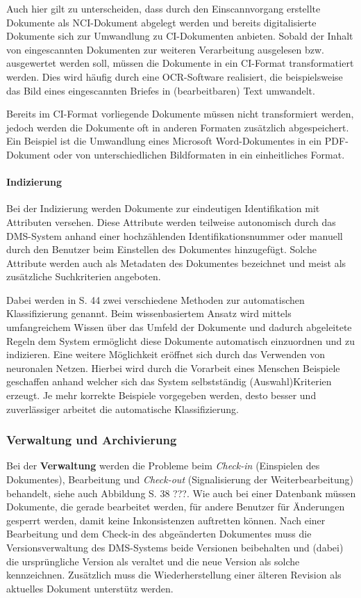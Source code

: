 Auch hier gilt zu unterscheiden, dass durch den Einscannvorgang erstellte Dokumente als \gls{NCI}-Dokument abgelegt werden und bereits digitalisierte Dokumente sich zur Umwandlung zu \gls{CI}-Dokumenten anbieten.
Sobald der Inhalt von eingescannten Dokumenten zur weiteren Verarbeitung ausgelesen bzw. ausgewertet werden soll, müssen die Dokumente in ein \gls{CI}-Format transformatiert werden.
Dies wird häufig durch eine \gls{OCR}-Software realisiert, die beispielsweise das Bild eines eingescannten Briefes in (bearbeitbaren) Text umwandelt.

Bereits im \gls{CI}-Format vorliegende Dokumente müssen nicht transformiert werden, jedoch werden die Dokumente oft in anderen Formaten zusätzlich abgespeichert.
Ein Beispiel ist die Umwandlung eines Microsoft Word-Dokumentes in ein \gls{PDF}-Dokument oder von unterschiedlichen Bildformaten in ein einheitliches Format.

\paragraph{Indizierung}
Bei der Indizierung werden Dokumente zur eindeutigen Identifikation mit Attributen versehen.
Diese Attribute werden teilweise autonomisch durch das DMS-System anhand einer hochzählenden Identifikationsnummer oder manuell durch den Benutzer beim Einstellen des Dokumentes hinzugefügt.
Solche Attribute werden auch als Metadaten des Dokumentes bezeichnet und meist als zusätzliche Suchkriterien angeboten.

Dabei werden in \cite{DMS08} S. 44 zwei verschiedene Methoden zur automatischen Klassifizierung genannt.
Beim wissenbasiertem Ansatz wird mittels umfangreichem Wissen über das Umfeld der Dokumente und dadurch abgeleitete Regeln dem System ermöglicht diese Dokumente automatisch einzuordnen und zu indizieren.
Eine weitere Möglichkeit eröffnet sich durch das Verwenden von neuronalen Netzen.
Hierbei wird durch die Vorarbeit eines Menschen Beispiele geschaffen anhand welcher sich das System selbstständig (Auswahl)Kriterien erzeugt.
Je mehr korrekte Beispiele vorgegeben werden, desto besser und zuverlässiger arbeitet die automatische Klassifizierung.

\subsubsection{Verwaltung und Archivierung}
Bei der \textbf{Verwaltung} werden die Probleme beim \textit{Check-in} (Einspielen des Dokumentes), Bearbeitung und \textit{Check-out} (Signalisierung der Weiterbearbeitung) behandelt, siehe auch Abbildung \cite{DMS08} S. 38 ???.
Wie auch bei einer Datenbank müssen Dokumente, die gerade bearbeitet werden, für andere Benutzer für Änderungen gesperrt werden, damit keine Inkonsistenzen auftretten können.
Nach einer Bearbeitung und dem Check-in des abgeänderten Dokumentes muss die Versionsverwaltung des DMS-Systems beide Versionen beibehalten und (dabei) die ursprüngliche Version als veraltet und die neue Version als solche kennzeichnen.
Zusätzlich muss die Wiederherstellung einer älteren Revision als aktuelles Dokument unterstütz werden.


